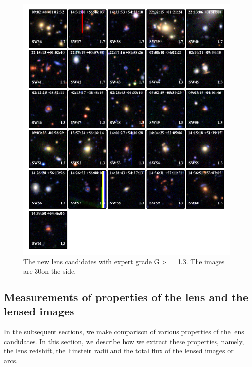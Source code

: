 \documentclass[useAMS,usenatbib,a4paper]{mn2e}
\begin{document}
\begin{figure}
\begin{center}
\includegraphics[scale=1.9]{sw-cfhtls-figs/lenscandfin_1.pdf}
\caption{ \label{fig:lc}
The new \sw lens candidates with expert grade G$>=$1.3. The images are
30\arcsec on the side.
}
\end{center}
\end{figure}

\subsection{Measurements of properties of the lens and the lensed images}
\label{sec:results:meas}

In the subsequent sections, we make comparison of various properties of the lens
candidates. In this section, we describe how we extract these properties, namely,
the lens redshift, the Einstein radii and the total flux of the lensed images or
arcs.
\end{document}
